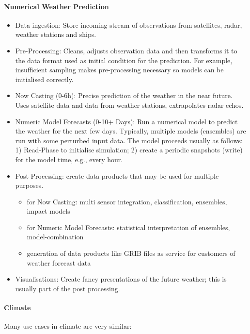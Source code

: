\paragraph{Numerical Weather Prediction}

\begin{itemize}
	\item Data ingestion: Store incoming stream of observations from satellites, radar, weather stations and ships.
	\item Pre-Processing: Cleans, adjusts observation data and then transforms it to the data format used as initial condition for the prediction. For example, insufficient sampling makes pre-processing necessary so models can be initialised correctly.
	\item Now Casting (0-6h): Precise prediction of the weather in the near future.
	Uses satellite data and data from weather stations, extrapolates radar echos.
	\item Numeric Model Forecasts (0-10+ Days): Run a numerical model to predict the weather for the next few days.
	Typically, multiple models (ensembles) are run with some perturbed input data.
	The model proceeds usually as follows: 1) Read-Phase to initialise simulation; 2) create a periodic snapshots (write) for the model time, e.g., every hour.
	\item  Post Processing: create data products that may be used for multiple purposes.
	\begin{itemize}
		\item for Now Casting: multi sensor integration, classification, ensembles, impact models
		\item for Numeric Model Forecasts: statistical interpretation of ensembles, model-combination
		\item generation of data products like GRIB files as service for customers of weather forecast data
	\end{itemize}
	\item Visualisations: Create fancy presentations of the future weather; this is usually part of the post processing.
\end{itemize}


\paragraph{Climate}

Many use cases in climate are very similar:

